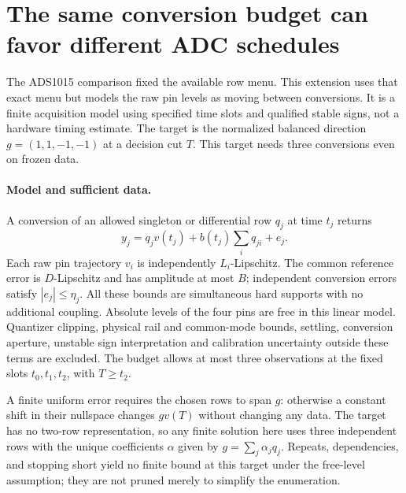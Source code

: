 \documentclass{article}
\begin{document}
\section*{The same conversion budget can favor different ADC schedules}
The ADS1015 comparison fixed the available row menu. This extension
uses that exact menu but models the raw pin levels as moving between
conversions. It is a finite acquisition model using specified time
slots and qualified stable signs, not a hardware timing estimate.
The target is the normalized balanced direction
$g=(1,1,-1,-1)$ at a decision cut $T$. This target needs three
conversions even on frozen data.

\paragraph{Model and sufficient data.}
A conversion of an allowed singleton or differential row $q_j$
at time $t_j$ returns
\[
    y_j=q_jv(t_j)+b(t_j)\sum_i q_{ji}+e_j .
\]
Each raw pin trajectory $v_i$ is independently $L_i$-Lipschitz.
The common reference error is $D$-Lipschitz and has amplitude at
most $B$; independent conversion errors satisfy $|e_j|\le\eta_j$.
All these bounds are simultaneous hard supports with no additional
coupling. Absolute levels of the four pins are free in this linear
model. Quantizer clipping, physical rail and common-mode bounds,
settling, conversion aperture, unstable sign interpretation and
calibration uncertainty outside these terms are excluded. The
budget allows at most three observations at the fixed slots
$t_0,t_1,t_2$, with $T\ge t_2$.

A finite uniform error requires the chosen rows to span $g$:
otherwise a constant shift in their nullspace changes $gv(T)$
without changing any data. The target has no two-row representation,
so any finite solution here uses three independent rows with the
unique coefficients $\alpha$ given by $g=\sum_j\alpha_jq_j$.
Repeats, dependencies, and stopping short yield no finite bound at
this target under the free-level assumption; they are not pruned
merely to simplify the enumeration.
\end{document}
